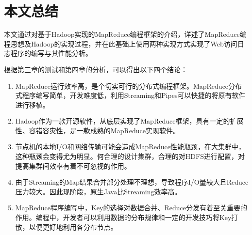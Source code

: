 \chapter{本文总结}
\label{chap:5}

本文通过对基于Hadoop实现的MapReduce编程框架的介绍，详述了MapReduce编程思想及Hadoop的实现过程，并在此基础上使用两种实现方式实现了Web访问日志程序的编写与其性能分析。

根据第三章的测试和第四章的分析，可以得出以下四个结论：

\begin{enumerate}
\item MapReduce运行效率高，是个切实可行的分布式编程框架。MapReduce分布式程序编写简单，开发难度低，利用Streaming和Pipes可以快捷的将原有软件进行移植。
\item Hadoop作为一款开源软件，从底层实现了MapReduce框架，具有一定的扩展性、容错容灾性，是一款成熟的MapReduce实现软件。
\item 节点机的本地I/O和网络传输可能会造成MapReduce性能瓶颈，在大集群中，这种瓶颈会变得尤为明显。何合理的设计集群，合理的对HDFS进行配置，对提高集群间效率有着不可忽视的作用。
\item 由于Streaming的Map结果合并部分处理不理想，导致程序I/O量较大且Reduce压力较大。因此现阶段，原生Java比Streaming效率高。
\item MapReduce程序编写中，Key的选择对数据合并、Reduce分发有着至关重要的作用。编程中，开发者可以利用数据的分布规律和一定的开发技巧将Key打散，以便更好地利用各分布节点。
\end{enumerate}